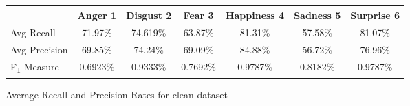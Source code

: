\begin{figure}[h]
\begin{center}
\caption{Average Recall and Precision Rates for clean dataset}
\begin{tabular}{ | l || c | c | c | c | c | c | }
    \hline
          & Anger 1 & Disgust 2 & Fear 3 & Happiness 4 & Sadness 5 & Surprise 6 \\ \hline \hline
        Avg Recall & 71.97\% & 74.619\% & 63.87\% & 81.31\% & 57.58\% & 81.07\% \\ \hline
        Avg Precision & 69.85\% & 74.24\% & 69.09\%  & 84.88\% & 56.72\% & 76.96\% \\ \hline
        F\textsubscript{1} Measure & 0.6923\% & 0.9333\% & 0.7692\% & 0.9787\% & 0.8182\% &
        0.9787\% \\ \hline
    \end{tabular}
    \label{fig:averageRecall}
\end{center}
\end{figure}

